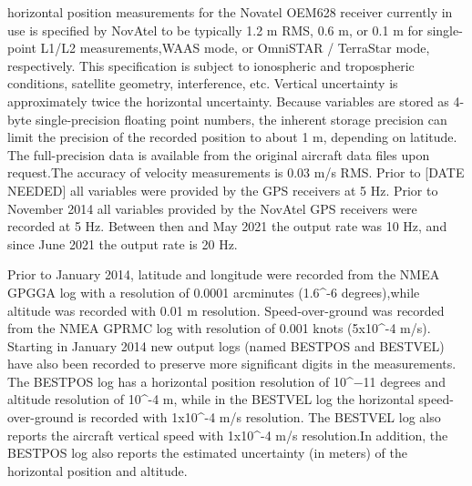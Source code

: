 \documentclass[
  english,
]{book}
\begin{document}
horizontal position measurements for the Novatel OEM628 receiver
currently in use is specified by NovAtel to be typically 1.2 m RMS, 0.6
m, or 0.1 m for single-point L1/L2 measurements,WAAS mode, or OmniSTAR /
TerraStar mode, respectively. This specification is subject to
ionospheric and tropospheric conditions, satellite geometry,
interference, etc. Vertical uncertainty is approximately twice the
horizontal uncertainty. Because variables are stored as 4-byte
single-precision floating point numbers, the inherent storage precision
can limit the precision of the recorded position to about 1 m, depending
on latitude. The full-precision data is available from the original
aircraft data files upon request.The accuracy of velocity measurements
is 0.03 m/s RMS. Prior to {[}DATE NEEDED{]} all variables were provided
by the GPS receivers at 5 Hz. Prior to November 2014 all variables
provided by the NovAtel GPS receivers were recorded at 5 Hz. Between
then and May 2021 the output rate was 10 Hz, and since June 2021 the
output rate is 20 Hz.

Prior to January 2014, latitude and longitude were recorded from the
NMEA GPGGA log with a resolution of 0.0001 arcminutes (1.6\^{}-6
degrees),while altitude was recorded with 0.01 m resolution.
Speed-over-ground was recorded from the NMEA GPRMC log with resolution
of 0.001 knots (5x10\^{}-4 m/s). Starting in January 2014 new output
logs (named BESTPOS and BESTVEL) have also been recorded to preserve
more significant digits in the measurements. The BESTPOS log has a
horizontal position resolution of 10\^{}−11 degrees and altitude
resolution of 10\^{}-4 m, while in the BESTVEL log the horizontal
speed-over-ground is recorded with 1x10\^{}-4 m/s resolution. The
BESTVEL log also reports the aircraft vertical speed with 1x10\^{}-4 m/s
resolution.In addition, the BESTPOS log also reports the estimated
uncertainty (in meters) of the horizontal position and altitude.
\end{document}
